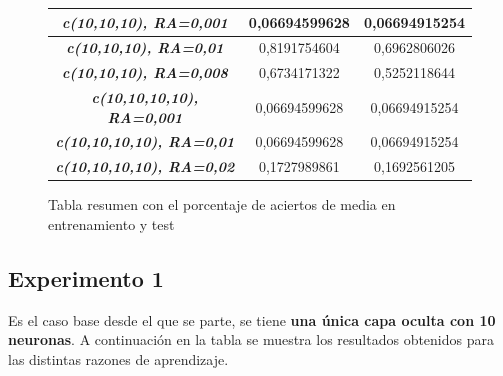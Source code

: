 \documentclass{uc3mpracticas}
\begin{document}
\begin{figure}[!h]
\begin{center}
\begin{tabular}{|c|c|c|}
        \textit{\textbf{c(10,10,10), RA=0,001}}&  0,06694599628                         &  0,06694915254               \\ \hline
        \rowcolor{LightGreen}
        \textit{\textbf{c(10,10,10), RA=0,01}}&  0,8191754604                         &  0,6962806026               \\ \hline
        \textit{\textbf{c(10,10,10), RA=0,008}}&  0,6734171322                         &  0,5252118644               \\ \hline \hline \hline

        \textit{\textbf{c(10,10,10,10), RA=0,001}}&  0,06694599628                        &  0,06694915254               \\ \hline
        \textit{\textbf{c(10,10,10,10), RA=0,01}}&  0,06694599628                         &  0,06694915254               \\ \hline
        \rowcolor{LightGreen}
        \textit{\textbf{c(10,10,10,10), RA=0,02}}&  0,1727989861                         &  0,1692561205               \\ \hline
  \end{tabular}
\end{center}
\caption*{Tabla resumen con el porcentaje de aciertos de media en entrenamiento y test}
\end{figure}



\subsection{Experimento 1}

Es el caso base desde el que se parte, se tiene \textbf{una única capa oculta con 10 neuronas}. A continuación en la tabla se muestra los resultados obtenidos para las distintas razones de aprendizaje.
\end{document}
